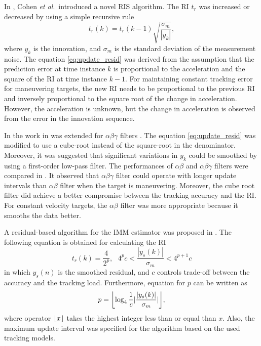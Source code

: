 \documentclass[english, 12pt, a4paper, elec, utf8, a-1b, online]{aaltothesis}
\newcommand{\etal}{\textit{et al}.~}
\newcommand{\ri}{t_r}
\DeclarePairedDelimiter\floor{\lfloor}{\rfloor}
\begin{document}
In \cite{Cohen1986}, Cohen \etal introduced a novel RIS algorithm.
The RI $\ri$ was increased or decreased by using a simple recursive rule 
\begin{equation}\label{eq:update_resid}
    \ri(k) = \ri(k-1)\sqrt{\frac{\sigma_m}{|y_k|}},
\end{equation}
where $y_k$ is the innovation, and $\sigma_m$ is the standard deviation of the measurement noise.
The equation \eqref{eq:update_resid} was derived from the assumption that the prediction error at time instance $k$ is proportional to the acceleration and the square of the RI at time instance $k-1$.
For maintaining constant tracking error for maneuvering targets, the new RI needs to be proportional to the previous RI and inversely proportional to the square root of the change in acceleration.
However, the acceleration is unknown, but the change in acceleration is observed from the error in the innovation sequence.

In \cite{Gardner1988} the work in \cite{Cohen1986} was extended for $\alpha\beta\gamma$ filters \cite{Brookner1998}. 
The equation \eqref{eq:update_resid} was modified to use a cube-root instead of the square-root in the denominator.
Moreover, it was suggested that significant variations in $y_k$ could be smoothed by using a first-order low-pass filter.
The performances of $\alpha\beta$ and $\alpha\beta\gamma$ filters were compared in \cite{Munu1992}.
It observed that $\alpha\beta\gamma$ filter could operate with longer update intervals than $\alpha\beta$ filter when the target is maneuvering.
Moreover, the cube root filter did achieve a better compromise between the tracking accuracy and the RI.
For constant velocity targets, the $\alpha\beta$ filter was more appropriate because it smooths the data better.

A residual-based algorithm for the IMM estimator was proposed in \cite{ChengTing2007}.
The following equation is obtained for calculating the RI
\begin{equation}
    \ri(k) = \frac{4}{2^p}, \text{ } 4^p c < \frac{|y_s(k)|}{\sigma_m} < 4^{p+1}c
\end{equation}
in which $y_s(n)$ is the smoothed residual, and $c$ controls trade-off between the accuracy and the tracking load.
Furthermore, equation for $p$ can be written as
\begin{equation}
    p = \floor*{\log_4\frac{1}{c}|\frac{|y_s(k)|}{\sigma_m}|},
\end{equation}
where operator $\floor*{x}$ takes the highest integer less than or equal than $x$.  
Also, the maximum update interval was specified for the algorithm based on the used tracking models.
\end{document}
